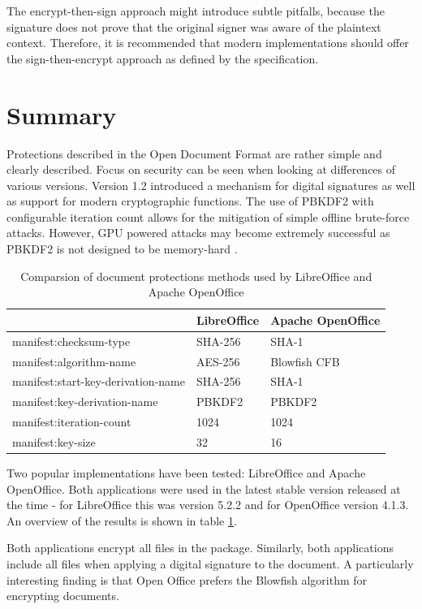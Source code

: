 \documentclass[11pt,oneside]{fithesis2}
\begin{document}
The encrypt-then-sign approach might introduce subtle pitfalls, because the signature does not prove that the original signer was aware of the plaintext context. Therefore, it is recommended that modern implementations should offer the sign-then-encrypt approach as defined by the specification.

\section{Summary}

Protections described in the Open Document Format are rather simple and clearly described. Focus on security can be seen when looking at differences of various versions. Version 1.2 introduced a mechanism for digital signatures as well as support for modern cryptographic functions. The use of PBKDF2 with configurable iteration count allows for the mitigation of simple offline brute-force attacks. However, GPU powered attacks may become extremely successful as PBKDF2 is not designed to be memory-hard \cite{PBKDF2_attack}.

\begin{table}[h]
	\centering
	\begin{tabular}{|l|l|l|}
               \hline
		&\textbf{LibreOffice}&\textbf{Apache OpenOffice}\\
	\hline
		manifest:checksum-type&SHA-256&SHA-1\\
	\hline
		manifest:algorithm-name&AES-256&Blowfish CFB\\
	\hline
		manifest:start-key-derivation-name&SHA-256&SHA-1\\
		manifest:key-derivation-name&PBKDF2&PBKDF2\\
		manifest:iteration-count&1024&1024\\
		manifest:key-size&32&16\\
	\hline
           \end{tabular}
	\caption{Comparsion of document protections methods used by LibreOffice and Apache OpenOffice}
	\label{odt_impl_results}
\end{table}

Two popular implementations have been tested: LibreOffice and Apache OpenOffice. Both applications were used in the latest stable version released at the time - for LibreOffice this was version 5.2.2 and for OpenOffice version 4.1.3. An overview of the results is shown in table \ref{odt_impl_results}.

Both applications encrypt all files in the package. Similarly, both applications include all files when applying a digital signature to the document. A particularly interesting finding is that Open Office prefers the Blowfish algorithm for encrypting documents.
\end{document}
